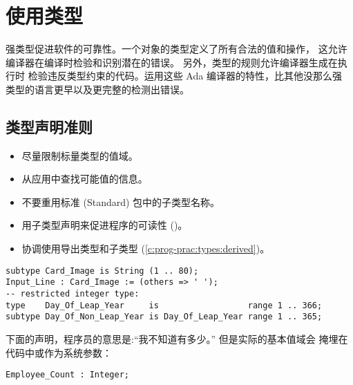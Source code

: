 %
%
%

\section{使用类型}

强类型促进软件的可靠性。一个对象的类型定义了所有合法的值和操作，
这允许编译器在编译时检验和识别潜在的错误。
另外，类型的规则允许编译器生成在执行时
检验违反类型约束的代码。运用这些 Ada 编译器的特性，比其他没那么强
类型的语言更早以及更完整的检测出错误。

\subsection{类型声明准则}
\begin{itemize}
    \item 尽量限制标量类型的值域。
    \item 从应用中查找可能值的信息。
    \item 不要重用标准 (Standard) 包中的子类型名称。
    \item 用子类型声明来促进程序的可读性 (\cite{booch87})。
    \item 协调使用导出类型和子类型 (\ref{c:prog-prac:types:derived})。
\end{itemize}

\begin{blockindent}
\begin{lstlisting}
subtype Card_Image is String (1 .. 80);
Input_Line : Card_Image := (others => ' ');
-- restricted integer type:
type    Day_Of_Leap_Year     is                  range 1 .. 366;
subtype Day_Of_Non_Leap_Year is Day_Of_Leap_Year range 1 .. 365;
\end{lstlisting}

下面的声明，程序员的意思是:``我不知道有多少。'' 但是实际的基本值域会
掩埋在代码中或作为系统参数：

\begin{lstlisting}
Employee_Count : Integer;
\end{lstlisting}
\end{blockindent}

